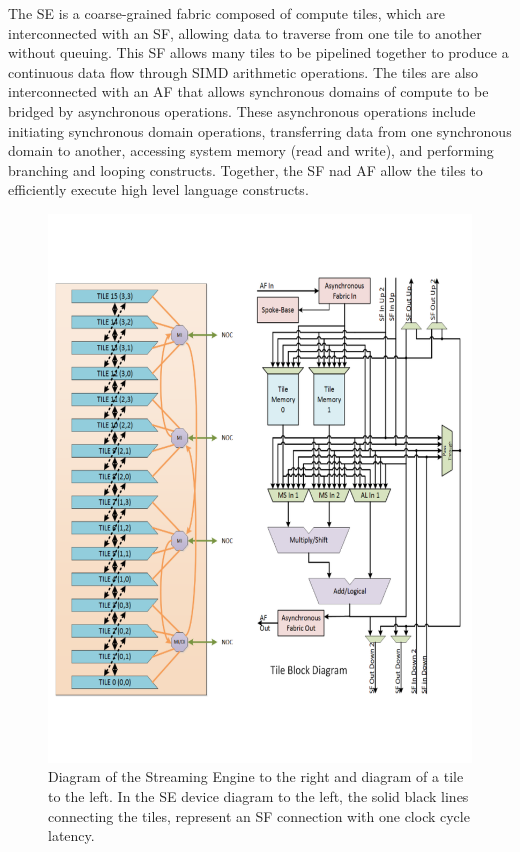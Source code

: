 The SE is a coarse-grained fabric composed of compute tiles, which are interconnected with an SF, allowing data to traverse from one tile to another without queuing.
This SF allows many tiles to be pipelined together to produce a continuous data flow through SIMD arithmetic operations.
The tiles are also interconnected with an AF that allows synchronous domains of compute to be bridged by asynchronous operations.
These asynchronous operations include initiating synchronous domain operations, transferring data from one synchronous domain to another, accessing system memory (read and write), and performing branching and looping constructs.
Together, the SF nad AF allow the tiles to efficiently execute high level language constructs.

\begin{figure}
  \centering
  \includegraphics[trim=10 100 8 50, clip, width=\linewidth]{fig/se_device_tile.pdf}
  \caption{
    Diagram of the Streaming Engine to the right and diagram of a tile to the left.
    In the SE device diagram to the left, the solid black lines connecting the tiles, represent an SF connection with one clock cycle latency.
}
\end{figure}
